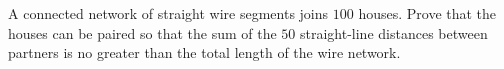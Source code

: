 A connected network of straight wire segments joins $100$ houses. Prove that the houses can be paired so that the sum of the $50$ straight-line distances between partners is no greater than the total length of the wire network.
